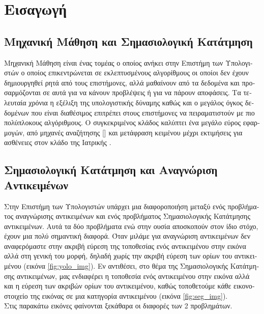 
\chapter{\textgreek{Εισαγωγή}}
\label{chapter_1}
\pagestyle{fancy}
\fancyhf{}
\renewcommand{\footrulewidth}{0.5pt}
\cfoot{\thepage}


\section{\textgreek{Μηχανική Μάθηση και Σημασιολογική Κατάτμηση}}
\textgreek{Μηχανική Μάθηση είναι ένας τομέας ο οποίος ανήκει στην Επιστήμη των Υπολογιστών ο οποίος επικεντρώνεται σε εκλεπτυσμένους αλγορίθμους οι οποίοι δεν έχουν δημιουργηθεί ρητά από τους επιστήμονες, αλλά μαθαίνουν από τα δεδομένα και προσαρμόζονται σε αυτά για να κάνουν προβλέψεις ή για να πάρουν αποφάσεις. Τα τελευταία χρόνια η εξέλιξη της υπολογιστικής δύναμης καθώς και ο μεγάλος όγκος δεδομένων που είναι διαθέσιμος επιτρέπει στους επιστήμονες να πειραματιστούν με πιο πολύπλοκους αλγόριθμους. Ο συγκεκριμένος κλάδος καλύπτει ένα μεγάλο εύρος εφαρμογών, από μηχανές αναζήτησης} []\textgreek{ και μετάφραση κειμένου }\cite{machine_translation}\textgreek{ μέχρι εκτιμήσεις για ασθένειες στον κλάδο της Ιατρικής} \cite{medical_pred}.

\section{\textgreek{Σημασιολογική Κατάτμηση και Αναγνώριση Αντικειμένων}}
\textgreek{Στην Επιστήμη των Υπολογιστών υπάρχει μια διαφοροποιήση μεταξύ ενός προβλήματος αναγνώρισης αντικειμένων και ενός προβλήματος Σημασιολογικής Κατάτμησης αντικειμένων. Αυτά τα δύο προβλήματα ενώ στην ουσία αποσκοπούν στον ίδιο στόχο, έχουν μια πολύ σημαντική διαφορά. Όταν μιλάμε για αναγνώριση αντικειμένων δεν αναφερόμαστε στην ακριβή εύρεση της τοποθεσίας ενός αντικειμένου στην εικόνα αλλά στη γενική του μορφή, δηλαδή χωρίς την ακριβή εύρεση των ορίων του αντικειμένου (εικόνα} \ref{fig:yolo_img}). \textgreek{Εν αντιθέσει, στο θέμα της Σημασιολογικής Κατάτμησης αντικειμένων, μας ενδιαφέρει η τοποθεσία ενός αντικειμένου στην εικόνα αλλά και η εύρεση των ακριβών ορίων του αντικειμένου, καθώς τοποθετούμε κάθε εικονοστοιχείο της εικόνας σε μια κατηγορία αντικειμένου (εικόνα} \ref{fig:seg_img}). \\[2cm] \textgreek{Στις παρακάτω εικόνες φαίνονται ξεκάθαρα οι διαφορές των 2 προβλημάτων.}

